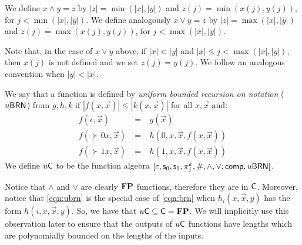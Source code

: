 \documentclass{lmcs}
\begin{document}
\begin{definition}
	We define $x\wedge y=z$ by $|z| = \min (|x|,|y|)$ and $z(j) = \min (x(j) , y(j))$, for $j< \min (|x|,|y|)$.
	We define analogously $x\vee y = z$ by $|z| = \max (|x|,|y|)$ and $z(j) = \max (x(j) , y(j))$, for $j< \max (|x|,|y|)$.
\end{definition}
Note that, in the case of $x \vee y$ above, if $|x|<|y|$ and $|x|\leq j< \max (|x|,|y|)$, then $x(j)$ is not defined and we set $z(j)=y(j)$. We follow an analogous convention when $|y|<|x|$.

\begin{definition}
      	We say that 
        a function is defined by \emph{uniform bounded recursion on notation} 
	($u\mathsf{BRN}$)  from $g, h, k$ if $|f(x, \vec x)| \leq |k(x , \vec x)|$ 
	for all $x, \vec x$ and:
	\begin{equation}
	\label{eqn:ubrn}
	\begin{array}{rcl}
	f(\epsilon, \vec x) & \ = \ & g(\vec x) \\ 
	f(\succ 0 x , \vec x) & \ =\ &  h (0, x , \vec x , f(x , \vec x)) \\
	f(\succ 1 x , \vec x) & \ =\ &  h (1, x , \vec x , f(x , \vec x)) 
	\end{array}
        \end{equation}
        We define $u \mathsf{C} $ to be the function algebra $[\varepsilon, \mathsf s_{0}, \mathsf s_{1} , \pi^k_j, \# , \wedge, \vee ; \mathsf{comp} , u\mathsf{BRN} ]$.
\end{definition}

Notice that $\wedge$ and $\vee$ are clearly $\mathbf{FP}$ functions, therefore they are in $\mathsf{C}$. Moreover, notice that \eqref{eqn:ubrn} is the special case of 
	\eqref{eqn:brn} when $h_i (x, \vec x , y)$ has the form $h(i, x , \vec x , y)$. So, we have that $u \mathsf{C}\subseteq\mathsf{C} = \mathbf{FP}$. We will implicitly use this observation later to ensure that the outputs of $u \mathsf{C}$ functions have lengths which are polynomially bounded on the lengths of the inputs.


\end{document}
